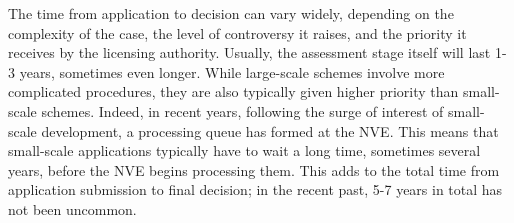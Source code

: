 The time from application to decision can vary widely, depending on the complexity of the case, the level of controversy it raises, and the priority it receives by the licensing authority. Usually, the assessment stage itself will last 1-3 years, sometimes even longer. While large-scale schemes involve more complicated procedures, they are also typically given higher priority than small-scale schemes. Indeed, in recent years, following the surge of interest of small-scale development, a processing queue has formed at the NVE. This means that small-scale applications typically have to wait a long time, sometimes several years, before the NVE begins processing them. This adds to the total time from application submission to final decision; in the recent past, 5-7 years in total has not been uncommon.

%
%
%
%
%
%
